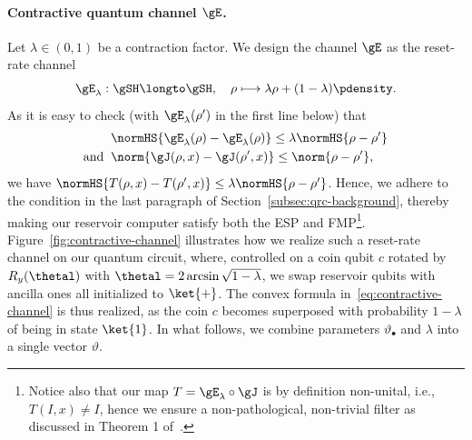 \paragraph{Contractive quantum channel $\gE$.} Let $\lambda \in (0,1)$ be a contraction factor. We design the channel $\gE$ as the reset-rate channel
\begin{equation}\label{eq:contractive-channel}
    \gE_\lambda: \gSH \longto \gSH, \quad \rho \longmapsto \lambda \rho + (1 - \lambda) \pdensity.
\end{equation}
As it is easy to check (with $\gE_\lambda(\rho')$ in the first line below) that
\begin{equation}
\begin{aligned}
    &\normHS{\gE_\lambda(\rho) - \gE_\lambda(\rho)} \leq \lambda \normHS{\rho - \rho'} \\
    \text{and} \;\; &\norm{\gJ(\rho, x) - \gJ(\rho', x)} \leq \norm{\rho - \rho'},
\end{aligned}
\end{equation}
we have $\normHS{T(\rho, x) - T(\rho', x)} \leq \lambda \normHS{\rho - \rho'}$. Hence, we adhere to the condition in the last paragraph of Section~\ref{subsec:qrc-background}, thereby making our reservoir computer satisfy both the ESP and FMP\footnote{Notice also that our map $T = \gE_\lambda \circ \gJ$ is by definition non-unital, i.e., $T(I, x) \neq I$, hence we ensure a non-pathological, non-trivial filter as discussed in Theorem 1 of~\cite{Mart_nez_Pe_a_2023}.}. Figure~\ref{fig:contractive-channel} illustrates how we realize such a reset-rate channel on our quantum circuit, where, controlled on a coin qubit $c$ rotated by $R_y(\thetal)$ with $\thetal = 2 \arcsin \sqrt{1-\lambda}$, we swap reservoir qubits with ancilla ones all initialized to $\ket{+}$. The convex formula in~\cref{eq:contractive-channel} is thus realized, as the coin $c$ becomes superposed with probability $1 - \lambda$ of being in state $\ket{1}$. In what follows, we combine parameters $\vartheta_{\bullet}$ and $\lambda$ into a single vector $\vartheta$.

